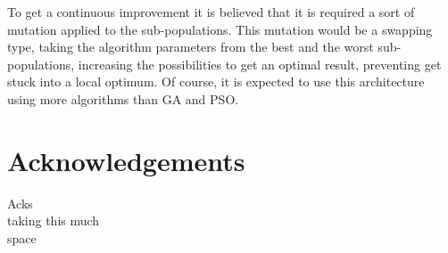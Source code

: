 \documentclass[runningheads]{llncs}
\begin{document}


To get a continuous improvement it is believed that it is required a sort of
mutation applied to the sub-populations. This mutation would be a swapping type,
taking the algorithm parameters from the best and the worst sub-populations,
increasing the possibilities to get an optimal result, preventing get stuck into
a local optimum. Of course, it is expected to use this architecture using more
algorithms than GA and PSO.


\section*{Acknowledgements}

Acks\\
taking this much\\
space


      
  
\end{document}
